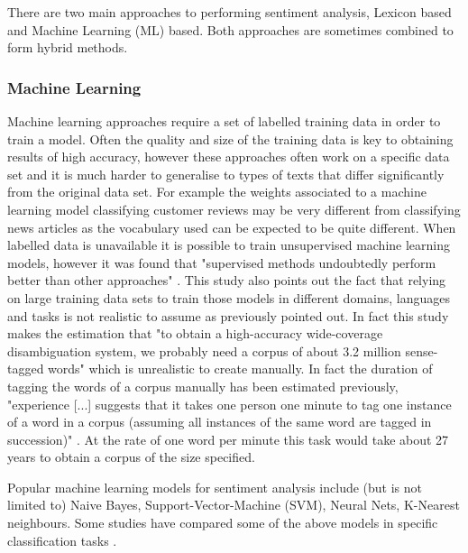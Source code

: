 There are two main approaches to performing sentiment analysis, Lexicon based and Machine Learning (ML) based. Both approaches are sometimes combined to form hybrid methods.

\subsubsection{Machine Learning}

Machine learning approaches require a set of labelled training data in order to train a model. Often the quality and size of the training data is key to obtaining results of high accuracy, however these approaches often work on a specific data set and it is much harder to generalise to types of texts that differ significantly from the original data set. For example the weights associated to a machine learning model classifying customer reviews may be very different from classifying news articles as the vocabulary used can be expected to be quite different. When labelled data is unavailable it is possible to train unsupervised machine learning models, however it was found that "supervised methods undoubtedly perform better than other approaches" \citep{navigli2009word}. This study also points out the fact that relying on large training data sets to train those models in different domains, languages and tasks is not realistic to assume as previously pointed out. In fact this study makes the estimation that "to obtain a high-accuracy wide-coverage disambiguation system, we probably need a corpus of about 3.2 million sense-tagged words" which is unrealistic to create manually. In fact the duration of tagging the words of a corpus manually has been estimated previously, "experience [...] suggests that it takes one person one minute to tag one instance of
a word in a corpus (assuming all instances of the same word are tagged in succession)" \citep{do2000designing}. At the rate of one word per minute this task would take about 27 years to obtain a corpus of the size specified.

Popular machine learning models for sentiment analysis include (but is not limited to) Naive Bayes, Support-Vector-Machine (SVM), Neural Nets, K-Nearest neighbours. Some studies have compared some of the above models in specific classification tasks \citep{wawre2016sentiment,ye2009sentiment,seo2020comparative}.

